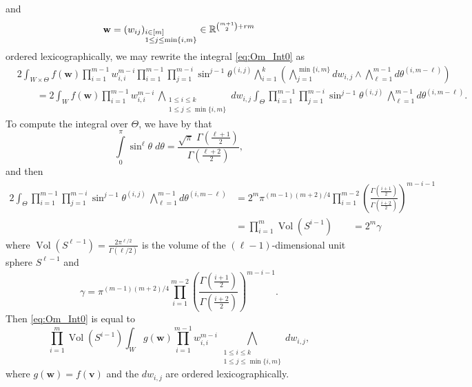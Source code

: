 \documentclass[twoside]{amsart}
\theoremstyle{definition}
\theoremstyle{remark}
\numberwithin{equation}{section}
\newcommand{\R}{\mathbb{R}}
\newcommand{\Vol}{\operatorname{Vol}}
\begin{document}
and
\[
    \mathbf{w} = (w_{ij})_{\begin{subarray}{l}i\in[m] \\ 1\leq j \leq \min\{i,m\}\end{subarray}}\in\R^{{m+1\choose 2}+rm}
\]
ordered lexicographically, we may rewrite the integral \eqref{eq:Om_Int0} as
\begin{align*}
    &2\int_{W\times\Theta}  f(\mathbf{w})
        \prod\limits_{i=1}^{m-1} w_{i,i}^{m-i}
        \prod\limits_{i=1}^{m-1} \prod\limits_{j=1}^{m-i} \sin^{j-1}\theta^{(i,j)}
        \bigwedge\limits_{i=1}^k \left( \bigwedge\limits_{j=1}^{\min\{i,m\}} dw_{i,j}
            \wedge \bigwedge\limits_{\ell=1}^{m-1} d\theta^{(i,m-\ell)}
        \right)
    \\&\qquad =
    2\int_{W}  f(\mathbf{w})
        \prod\limits_{i=1}^{m-1} w_{i,i}^{m-i} \,
        \bigwedge\limits_{\substack{1\leq i\leq k \\ 1\leq j \leq {\min\{i,m\}} }}  dw_{i,j}
    \int_\Theta \prod\limits_{i=1}^{m-1} \prod\limits_{j=1}^{m-i} \sin^{j-1}\theta^{(i,j)}
        \, \bigwedge\limits_{\ell=1}^{m-1} d\theta^{(i,m-\ell)}.
\end{align*}
To compute the integral over $\Theta$, we have by \cite[6.2.1 and 6.2.2]{AbramowitzStegun} that
\[
    \int\limits_0^\pi \sin^\ell \theta\;d\theta
        =   \frac{\sqrt{\pi}\;\Gamma\left(\frac{\ell+1}{2}\right)}{\Gamma\left(\frac{\ell+2}{2}\right)},
\]
and then
\begin{align*}
    2\int_\Theta \prod\limits_{i=1}^{m-1} \prod\limits_{j=1}^{m-i} \sin^{j-1}\theta^{(i,j)}
        \, \bigwedge\limits_{\ell=1}^{m-1} d\theta^{(i,m-\ell)}
    &=
    2^m\pi^{(m-1)(m+2)/4}
        \prod\limits_{i=1}^{m-2} \left( \frac{ \Gamma\left(\frac{i+1}{2}\right) }{ \Gamma\left(\frac{i+2}{2}\right)} \right)^{m-i-1}
    \\&=    \prod\limits_{i=1}^m \Vol(S^{i-1})
    \qquad= 2^m \gamma
\end{align*}
where $\Vol(S^{\ell-1}) = \frac{2\pi^{\ell/2}}{\Gamma(\ell/2)}$ is the volume of the $(\ell-1)$-dimensional unit sphere $S^{\ell-1}$ and
\[
    \gamma = \pi^{(m-1)(m+2)/4}
        \prod\limits_{i=1}^{m-2} \left( \frac{ \Gamma\left(\frac{i+1}{2}\right) }{ \Gamma\left(\frac{i+2}{2}\right)} \right)^{m-i-1}.
\]
Then \eqref{eq:Om_Int0} is equal to
\begin{equation}
\label{eq:Om_Int1}
    \prod\limits_{i=1}^m \Vol(S^{i-1}) \int_{W}  g(\mathbf{w})
        \prod\limits_{i=1}^{m-1} w_{i,i}^{m-i} \,
        \bigwedge\limits_{\substack{1\leq i\leq k \\ 1\leq j \leq {\min\{i,m\}} }}  dw_{i,j},
\end{equation}
where $g(\mathbf{w}) = f(\mathbf{v})$ and the $dw_{i,j}$ are ordered lexicographically.
\end{document}
